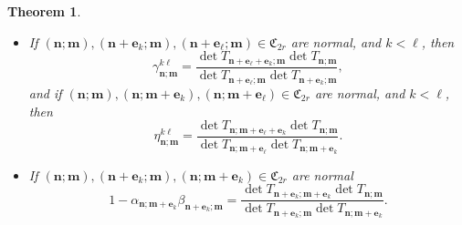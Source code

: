\documentclass[reqno,centertags,11pt,draft]{amsart}
\newtheorem{thm}{Theorem}[section]
\begin{document}
\begin{thm}
\begin{itemize}
            \item[(iii)] If $(\bm{n};\bm{m}),(\bm{n}+\bm{e}_k;\bm{m}),(\bm{n}+\bm{e}_\ell;\bm{m})\in\mathfrak{C}_{2r}$  are normal, and $k < \ell$, then
            \begin{equation}
                \gamma^{k\ell}_{\bm{n};\bm{m}} = \frac{\det T_{\bm{n}+\bm{e}_\ell+\bm{e}_k;\bm{m}} \det T_{\bm{n};\bm{m}} }{\det T_{\bm{n}+\bm{e}_\ell;\bm{m}} \det T_{\bm{n}+\bm{e}_k;\bm{m}}} ,
            \end{equation}
            and if $(\bm{n};\bm{m}),(\bm{n};\bm{m}+\bm{e}_k),(\bm{n};\bm{m}+\bm{e}_\ell)\in\mathfrak{C}_{2r}$  are normal, and $k < \ell$, then
            \begin{equation}
                \eta^{k\ell}_{\bm{n};\bm{m}} = \frac{\det T_{\bm{n};\bm{m}+\bm{e}_\ell+\bm{e}_k} \det T_{\bm{n};\bm{m}} }{\det T_{\bm{n};\bm{m}+\bm{e}_\ell} \det T_{\bm{n};\bm{m}+\bm{e}_k}} .
            \end{equation}
            \item[(iv)] If $(\bm{n};\bm{m}),(\bm{n}+\bm{e}_k;\bm{m}),(\bm{n};\bm{m}+\bm{e}_k)\in\mathfrak{C}_{2r}$  are normal
            \begin{equation}
                1-\alpha_{\bm{n};\bm{m}+\bm{e}_k}\beta_{\bm{n}+\bm{e}_k;\bm{m}} = \frac{\det{T_{\bm{n}+\bm{e}_k;\bm{m}+\bm{e}_k}}\det{T_{\bm{n};\bm{m}}}}{\det{T_{\bm{n}+\bm{e}_k;\bm{m}}}\det{T_{\bm{n};\bm{m}+\bm{e}_k}}}.
            \end{equation}
            
        \end{itemize}
    \end{thm}
\end{document}
